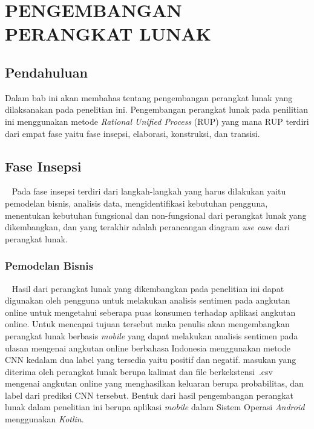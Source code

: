\pagestyle{fancy}
\rhead{}
\setcounter{page}{1}
\chapter{PENGEMBANGAN PERANGKAT LUNAK}

\section{Pendahuluan}
Dalam bab ini akan membahas tentang pengembangan perangkat lunak yang dilaksanakan
pada penelitian ini. Pengembangan perangkat lunak pada penilitian ini menggunakan metode \emph{Rational Unified Process} (RUP)
yang mana RUP terdiri dari empat fase yaitu fase insepsi, elaborasi, konstruksi, dan transisi.

\section{Fase Insepsi}~\label{fase_insepsi}
Pada fase insepsi terdiri dari langkah-langkah yang harus dilakukan yaitu pemodelan bisnis,
analisis data, mengidentifikasi kebutuhan pengguna, menentukan kebutuhan fungsional dan non-fungsional
dari perangkat lunak yang dikembangkan, dan yang terakhir adalah perancangan diagram \emph{use case}
dari perangkat lunak.

\subsection{Pemodelan Bisnis}~\label{insepsi_pemodelan_bisnis}
Hasil dari perangkat lunak yang dikembangkan pada penelitian ini dapat digunakan oleh pengguna
untuk melakukan analisis sentimen pada angkutan online untuk mengetahui seberapa puas konsumen
terhadap aplikasi angkutan online. Untuk mencapai tujuan tersebut maka penulis akan mengembangkan
perangkat lunak berbasis \emph{mobile} yang dapat melakukan analisis sentimen pada ulasan mengenai angkutan
online berbahasa Indonesia menggunakan metode CNN kedalam dua label yang tersedia yaitu positif dan
negatif. masukan yang diterima oleh perangkat lunak berupa kalimat dan file berkekstensi~.csv mengenai
angkutan online yang menghasilkan keluaran berupa probabilitas, dan label dari prediksi CNN
tersebut. Bentuk dari hasil pengembangan perangkat lunak dalam penelitian ini berupa
aplikasi \emph{mobile} dalam Sistem Operasi \emph{Android} menggunakan \emph{Kotlin}. \newpage

\pagestyle{fancy}
\cfoot{}
